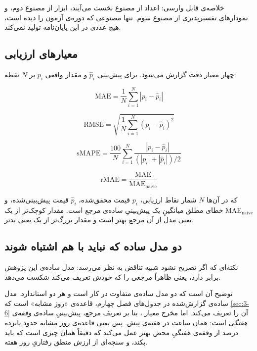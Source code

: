 خلاصه‌ی قابل وارسی: اعداد از مصنوع نخست می‌آیند، ابزار از مصنوع دوم، و نمودارهای
تفسیرپذیری از مصنوع سوم. تنها مصنوعی که دوره‌ی آزمون را دیده است، هیچ عددی در این
پایان‌نامه تولید نمی‌کند.

\subsection*{معیارهای ارزیابی}

چهار معیار دقت گزارش می‌شود. برای پیش‌بینی $\hat{p}_i$ و مقدار واقعی $p_i$ بر
$N$ نقطه:

\begin{equation}
\mathrm{MAE} = \frac{1}{N}\sum_{i=1}^{N}\left|p_i - \hat{p}_i\right|
\end{equation}

\begin{equation}
\mathrm{RMSE} = \sqrt{\frac{1}{N}\sum_{i=1}^{N}\left(p_i - \hat{p}_i\right)^2}
\end{equation}

\begin{equation}
\mathrm{sMAPE} = \frac{100}{N}\sum_{i=1}^{N}
\frac{\left|p_i - \hat{p}_i\right|}{\left(|p_i| + |\hat{p}_i|\right)/2}
\end{equation}

\begin{equation}
\mathrm{rMAE} = \frac{\mathrm{MAE}}{\mathrm{MAE}_{\mathrm{naive}}}
\end{equation}

که در آن‌ها $N$ شمار نقاط ارزیابی، $p_i$ قیمت محقق‌شده، $\hat{p}_i$ قیمت
پیش‌بینی‌شده، و $\mathrm{MAE}_{\mathrm{naive}}$ خطای مطلق میانگینِ یک پیش‌بینیِ ساده‌ی
مرجع است. مقدار  کوچک‌تر از یک یعنی مدل از آن مرجع بهتر است و مقدار بزرگ‌تر
از یک یعنی بدتر.

\subsection*{دو مدل ساده که نباید با هم اشتباه شوند}

نکته‌ای که اگر تصریح نشود شبیه تناقض به نظر می‌رسد: مدل ساده‌ی این پژوهش 
برابر  دارد، یعنی ظاهراً مرجعی را که خودش تعریف می‌کند شکست می‌دهد.

توضیح آن است که دو مدل ساده‌ی متفاوت در کار است و هر دو استاندارد. مدل ساده‌ی گزارش‌شده
در جدول‌های فصل چهارم، قاعده‌ی «روز مشابه» است که \cref{sec:3-6} آن را تعریف می‌کند. اما مخرج
معیار ، بنا بر تعریف مرجع، پیش‌بینیِ ساده‌ی \emph{وقفه‌ی هفتگی} است: همان ساعت
در هفته‌ی پیش. پس  یعنی قاعده‌ی روز مشابه حدود پانزده درصد از وقفه‌ی هفتگیِ
محض بهتر عمل می‌کند  که دقیقاً همان چیزی است که باید بکند، و سنجه‌ای از ارزش
منطق رفتاریِ روز هفته.

